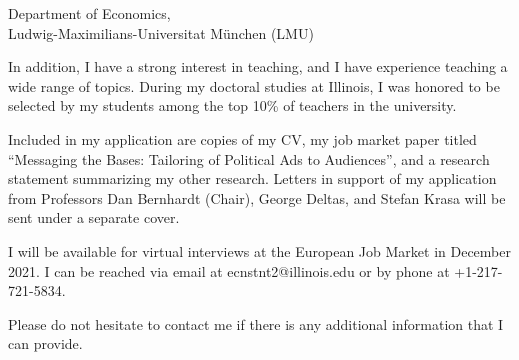 \documentclass[12pt]{letter}
\begin{document}
\begin{letter}{Department of Economics,\\
    Ludwig-Maximilians-Universitat München (LMU)}




In addition, I have a strong interest in teaching, and I have experience teaching a wide range of topics.
During my doctoral studies at Illinois, I was honored to be selected by my students among the top 10\% of teachers in the university.


Included in my application are copies of my CV, my job market paper titled ``Messaging the Bases: Tailoring of Political Ads to Audiences'',
and a research statement summarizing my other research.
Letters in support of my application from Professors Dan Bernhardt (Chair), George Deltas, and Stefan Krasa will be sent under a separate cover. 


I will be available for virtual interviews at the European Job Market in December 2021.
I can be reached via email at ecnstnt2@illinois.edu or by phone at +1-217-721-5834.

Please do not hesitate to contact me if there is any additional information that I can provide.


\end{letter}
\end{document}
